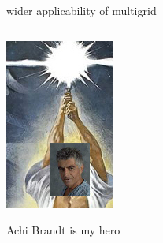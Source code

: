 \documentclass[hide notes,intlimits,usenames,dvipsnames]{beamer}
\begin{document}
\begin{frame}{wider applicability of multigrid}
\begin{columns}
\begin{column}{0.2\textwidth}
\includegraphics[width=\textwidth]{figs/starwars-achi-mashup.jpg}

\tiny Achi Brandt is my hero


\end{column}
\end{columns}
\end{frame}
\end{document}
